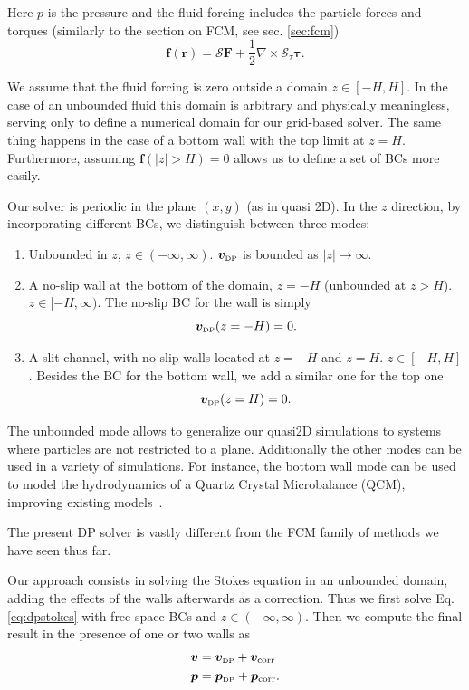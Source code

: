 \documentclass[twoside,openright,titlepage,numbers=noenddot,%
headinclude,footinclude,cleardoublepage=empty,abstract=on,
BCOR=5mm,fontsize=11pt, dvipsnames, paper=b5
]{scrreprt}
\renewcommand{\vec}[1]{\bm{#1}}
\newcommand{\oper}[1]{\mathcal{#1}}
\newcommand{\half}{\frac{1}{2}}
\newcommand{\fpos}{r}
\newcommand{\fvel}{v}
\newcommand{\corr}{\text{corr}}
\newcommand{\dpr}{\text{\tiny DP}}
\begin{document}
Here $p$ is the pressure and the fluid forcing includes the particle forces and torques (similarly to the section on \gls{FCM}, see sec. \ref{sec:fcm})
\begin{equation}
  \vec{f}(\vec{\fpos}) = \oper{S}\vec{F} + \half\nabla\times\oper{S}_{\tau}\vec{\tau}.
\end{equation}

We assume that the fluid forcing is zero outside a domain $z\in [-H, H]$. In the case of an unbounded fluid this domain is arbitrary and physically meaningless, serving only to define a numerical domain for our grid-based solver. The same thing happens in the case of a bottom wall with the top limit at $z=H$. Furthermore, assuming $\vec{f}(|z|>H) = 0$ allows us to define a set of \glspl{BC} more easily.

Our solver is periodic in the plane $(x,y)$ (as in quasi 2D). In the $z$ direction, by incorporating different \glspl{BC}, we distinguish between three modes:
\begin{enumerate}
\item Unbounded in $z$, $z\in(-\infty, \infty)$. $\vec{\fvel}_{\dpr}$ is bounded as $|z|\rightarrow\infty$.
\item A no-slip  wall at the bottom of the domain, $z=-H$ (unbounded at $z>H$). $z\in [-H, \infty)$.
  The no-slip \gls{BC} for the wall is simply
  \begin{equation}
    \label{eq:dpstokesbwvelbc}
    \vec{\fvel}_{\dpr}(z=-H) = 0.   
  \end{equation} 
\item A slit channel, with no-slip walls located at $z=-H$ and $z=H$. $z\in [-H, H]$. Besides the \gls{BC} for the bottom wall, we add a similar one for the top one
  \begin{equation}
    \label{eq:dpstokestwvelbc}
    \vec{\fvel}_{\dpr}(z=H) = 0.
  \end{equation}
\end{enumerate}
The unbounded mode allows to generalize our quasi2D simulations to systems where particles are not restricted to a plane. Additionally the other modes can be used in a variety of simulations. For instance, the bottom wall mode can be used to model the hydrodynamics of a Quartz Crystal Microbalance (QCM), improving existing models~\cite{Melendez2020}.

The present \gls{DP} solver is vastly different from the \gls{FCM} family of methods we have seen thus far.

Our approach consists in solving the Stokes equation in an unbounded domain, adding the effects of the walls afterwards as a correction. Thus we first solve Eq. \eqref{eq:dpstokes} with free-space \glspl{BC} and $z\in (-\infty, \infty)$. Then we compute the final result in the presence of one or two walls as
\begin{equation}
  \label{eq:dpstokescorrsum}
  \begin{aligned}
  &\vec{\fvel} =   \vec{\fvel}_{\dpr} +   \vec{\fvel}_{\corr}\\
  &\vec{p} =   \vec{p}_{\dpr} +   \vec{p}_{\corr}.
\end{aligned}
\end{equation}
\end{document}
